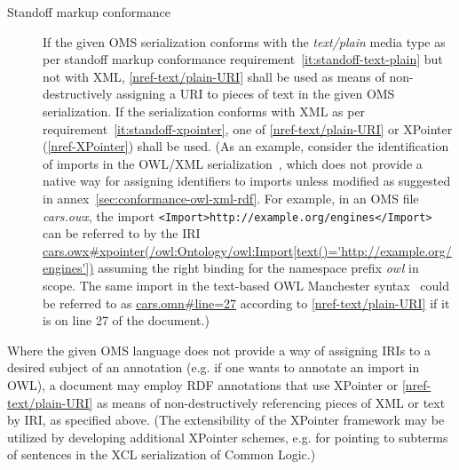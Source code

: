 \documentclass[10pt, a4paper]{isov2}
\makeatletter
\newcommand*{\eg}{e.g.\@\xspace}
\newcommand*{\mimetype}[1]{\textit{#1}}
\renewcommand{\noterefname}{note}
\renewcommand{\nref}[1]{\noterefname~\ref{#1}}
\renewcommand{\nref}[1]{\ref{nref-#1}}
\makeatother
\begin{document}
\begin{description}
\item[Standoff markup conformance] If the given OMS serialization conforms with the \mimetype{text/plain} media type as per standoff markup conformance requirement~\ref{it:standoff-text-plain} but not with XML, \nref{text/plain-URI} shall be used as means of non-destructively assigning a URI to pieces of text in the given OMS serialization.
If the serialization conforms with XML as per requirement~\ref{it:standoff-xpointer}, one of \nref{text/plain-URI} or XPointer (\nref{XPointer}) shall be used. { (As an example, consider the identification of imports in the OWL/XML serialization~\cite{W3C:REC-owl2-xml-serialization-20121211}, which does not provide a native way for assigning identifiers to imports unless modified as suggested in annex~\ref{sec:conformance-owl-xml-rdf}.  For example, in an OMS file \textit{cars.owx}, the import \texttt{<Import>http://example.org/engines</Import>} can be referred to by the IRI \url{cars.owx\#xpointer(/owl:Ontology/owl:Import[text()='http://example.org/engines'])} assuming the right binding for the namespace prefix \textit{owl} in scope.
The same import in the text-based OWL Manchester syntax~\cite{W3C:NOTE-owl2-manchester-syntax-20091027} could be referred to as \url{cars.omn\#line=27} according to \nref{text/plain-URI} if it is on line 27 of the document.)}
 \end{description} 

Where the given OMS language does not provide a way of assigning IRIs to a desired subject of an annotation (\eg if one wants to annotate an import in OWL), a document may employ RDF annotations that use XPointer or \nref{text/plain-URI} as means of non-destructively referencing pieces of XML or text by IRI, as specified above. (The extensibility of the XPointer framework may be utilized by developing additional XPointer schemes, \eg for pointing to subterms of sentences in the XCL serialization of Common Logic.) 


\end{document}
